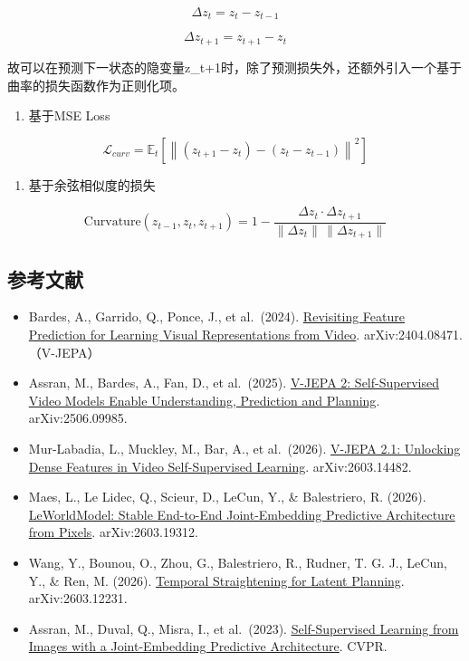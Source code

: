 \[
\Delta z_t = z_t - z_{t-1}
\]

\[
\Delta z_{t+1} = z_{t+1} - z_t
\]

故可以在预测下一状态的隐变量z\_t+1时，除了预测损失外，还额外引入一个基于曲率的损失函数作为正则化项。

\begin{enumerate}
\def\labelenumi{\arabic{enumi}.}
\tightlist
\item
  基于MSE Loss
\end{enumerate}

\[
\mathcal{L}_{curv} = \mathbb{E}_t\left[\left\| (z_{t+1}-z_t) - (z_t-z_{t-1}) \right\|^2\right]
\]

\begin{enumerate}
\def\labelenumi{\arabic{enumi}.}
\setcounter{enumi}{1}
\tightlist
\item
  基于余弦相似度的损失
\end{enumerate}

\[
\mathrm{Curvature}(z_{t-1}, z_t, z_{t+1}) = 1 - \frac{\Delta z_t \cdot \Delta z_{t+1}}{\|\Delta z_t\|\,\|\Delta z_{t+1}\|}
\]

\FloatBarrier
{}
\hypertarget{ux53c2ux8003ux6587ux732e-157}{%
\subsection{参考文献}\label{ux53c2ux8003ux6587ux732e-157}}

\vspace{0.25em}
\begin{itemize}
\tightlist
\item
  Bardes, A., Garrido, Q., Ponce, J., et al.~(2024). \href{https://arxiv.org/abs/2404.08471}{Revisiting Feature Prediction for Learning Visual Representations from Video}. arXiv:2404.08471.（V-JEPA）
\item
  Assran, M., Bardes, A., Fan, D., et al.~(2025). \href{https://arxiv.org/abs/2506.09985}{V-JEPA 2: Self-Supervised Video Models Enable Understanding, Prediction and Planning}. arXiv:2506.09985.
\item
  Mur-Labadia, L., Muckley, M., Bar, A., et al.~(2026). \href{https://arxiv.org/abs/2603.14482}{V-JEPA 2.1: Unlocking Dense Features in Video Self-Supervised Learning}. arXiv:2603.14482.
\item
  Maes, L., Le Lidec, Q., Scieur, D., LeCun, Y., \& Balestriero, R. (2026). \href{https://arxiv.org/abs/2603.19312}{LeWorldModel: Stable End-to-End Joint-Embedding Predictive Architecture from Pixels}. arXiv:2603.19312.
\item
  Wang, Y., Bounou, O., Zhou, G., Balestriero, R., Rudner, T. G. J., LeCun, Y., \& Ren, M. (2026). \href{https://arxiv.org/abs/2603.12231}{Temporal Straightening for Latent Planning}. arXiv:2603.12231.
\item
  Assran, M., Duval, Q., Misra, I., et al.~(2023). \href{https://arxiv.org/abs/2301.08243}{Self-Supervised Learning from Images with a Joint-Embedding Predictive Architecture}. CVPR.
\end{itemize}

\clearpage
